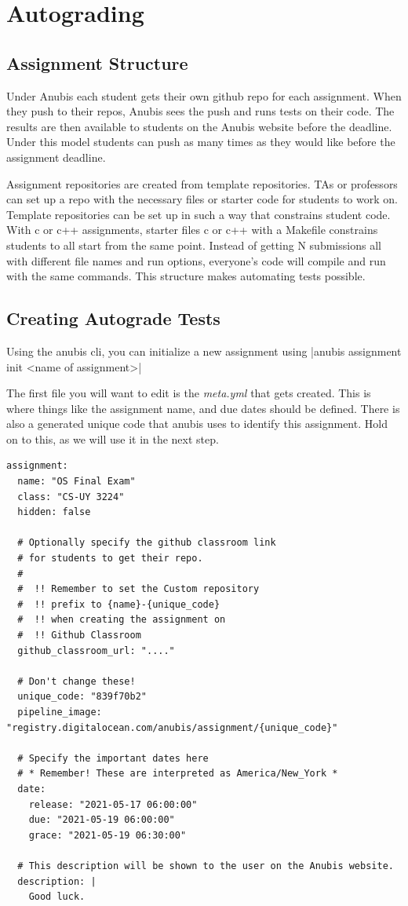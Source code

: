 \chapter{Autograding}\label{ch:assignments}


\section{Assignment Structure}\label{sec:assignment-structure}

Under Anubis each student gets their own github repo for each assignment.
When they push to their repos, Anubis sees the push and runs tests on their code.
The results are then available to students on the Anubis website before the deadline.
Under this model students can push as many times as they would like before the assignment deadline.

Assignment repositories are created from template repositories.
TAs or professors can set up a repo with the necessary files or starter code for students
to work on.
Template repositories can be set up in such a way that constrains student code.
With c or c++ assignments, starter files c or c++ with a Makefile constrains students
to all start from the same point.
Instead of getting N submissions all with different file names and run options,
everyone's code will compile and run with the same commands.
This structure makes automating tests possible.


\section{Creating Autograde Tests}\label{sec:creating-autograde-tests}

Using the anubis cli, you can initialize a new assignment using
|anubis assignment init <name of assignment>|

The first file you will want to edit is the \textit{meta.yml} that gets created.
This is where things like the assignment name, and due dates should be defined.
There is also a generated unique code that anubis uses to identify this assignment.
Hold on to this, as we will use it in the next step.

\begin{verbatim}
assignment:
  name: "OS Final Exam"
  class: "CS-UY 3224"
  hidden: false

  # Optionally specify the github classroom link
  # for students to get their repo.
  #
  #  !! Remember to set the Custom repository
  #  !! prefix to {name}-{unique_code}
  #  !! when creating the assignment on
  #  !! Github Classroom
  github_classroom_url: "...."

  # Don't change these!
  unique_code: "839f70b2"
  pipeline_image: "registry.digitalocean.com/anubis/assignment/{unique_code}"

  # Specify the important dates here
  # * Remember! These are interpreted as America/New_York *
  date:
    release: "2021-05-17 06:00:00"
    due: "2021-05-19 06:00:00"
    grace: "2021-05-19 06:30:00"

  # This description will be shown to the user on the Anubis website.
  description: |
    Good luck.
\end{verbatim}


